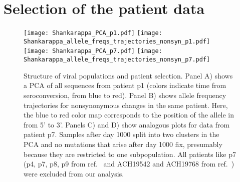 

\makeatletter 
\renewcommand{\thefigure}{S\@arabic\c@figure}
\makeatother

\section{Selection of the patient data}
\begin{figure}[!ht]
\begin{center}
\texttt{[image: Shankarappa\_PCA\_p1.pdf]}
\texttt{[image: Shankarappa\_allele\_freqs\_trajectories\_nonsyn\_p1.pdf]}
\texttt{[image: Shankarappa\_PCA\_p7.pdf]}
\texttt{[image: Shankarappa\_allele\_freqs\_trajectories\_nonsyn\_p7.pdf]}
\caption{Structure of viral populations and patient selection.
Panel A) shows a PCA of all sequences from patient p1 (colors indicate time from
seroconversion, from blue to red). Panel B) shows allele frequency trajectories for nonsynonymous
changes in the same patient. Here, the blue to red color map corresponds to the
position of the allele in \env{} from 5' to 3'. Panels C) and D) show analogous
plots for data from patient p7. Samples after day 1000 split into two clusters in the PCA and no mutations that arise after day 1000 fix, presumably because they are restricted
to one subpopulation. All patients like p7 (p4, p7, p8, p9 from ref.~\cite{shankarappa_consistent_1999} and
ACH19542 and ACH19768 from ref.~\cite{bunnik_autologous_2008}) were excluded
from our analysis.}
\label{fig:aftp}
\end{center}
\end{figure}

\newpage
